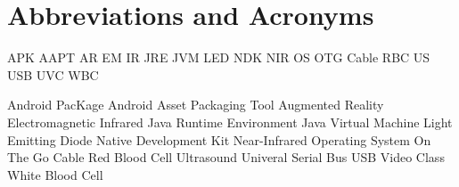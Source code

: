 \chapter{Abbreviations and Acronyms}\label{chapter:abbreviations}

\begin{multicols}{2}
\setlength{\parindent}{0pt}

	APK
	\hfill \break
	AAPT
	\hfill \break
	AR
	\hfill \break 
	EM
	\hfill \break 
	IR
	\hfill \break 
	JRE
	\hfill \break
	JVM
	\hfill \break
	LED
	\hfill \break 
	NDK
	\hfill \break
	NIR
	\hfill \break 
	OS
	\hfill \break
	OTG Cable
	\hfill \break 
	RBC
	\hfill \break 
	US
	\hfill \break 
	USB
	\hfill \break
	UVC	
	\hfill \break 
	WBC



	
\columnbreak
 
	Android PacKage 
	\hfill \break
	Android Asset Packaging Tool
	\hfill \break
	Augmented Reality
	\hfill \break 
	Electromagnetic
	\hfill \break 
	Infrared
	\hfill \break
	Java Runtime Environment
	\hfill \break
	Java Virtual Machine
	\hfill \break 
	Light Emitting Diode
 	\hfill \break
	Native Development Kit 
	\hfill \break
	Near-Infrared
	\hfill \break
	Operating System
 	\hfill \break
	On The Go Cable
	\hfill \break
	Red Blood Cell 
	\hfill \break
	Ultrasound
	\hfill \break 
	Univeral Serial Bus
	\hfill \break 
	USB Video Class
	\hfill \break
	White Blood Cell 

\end{multicols}